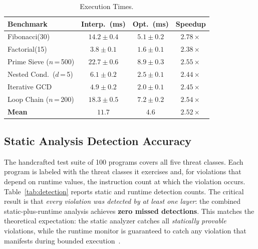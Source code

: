 \documentclass[conference]{IEEEtran}
\begin{document}
\begin{table}[t]
\caption{Execution Times.}
\label{tab:perf}
\centering
\renewcommand{\arraystretch}{1.18}
\small
\begin{tabular}{@{} l c c c @{}}
\toprule
\textbf{Benchmark} & \textbf{Interp.\ (ms)} &
\textbf{Opt.\ (ms)} & \textbf{Speedup} \\
\midrule
Fibonacci(30)              & $14.2 \pm 0.4$ & $5.1 \pm 0.2$ & $2.78\times$ \\
Factorial(15)              & $3.8  \pm 0.1$ & $1.6 \pm 0.1$ & $2.38\times$ \\
Prime Sieve ($n$\,=\,500)  & $22.7 \pm 0.6$ & $8.9 \pm 0.3$ & $2.55\times$ \\
Nested Cond.\ ($d$\,=\,5)  & $6.1  \pm 0.2$ & $2.5 \pm 0.1$ & $2.44\times$ \\
Iterative GCD              & $4.9  \pm 0.2$ & $2.0 \pm 0.1$ & $2.45\times$ \\
Loop Chain ($n$\,=\,200)   & $18.3 \pm 0.5$ & $7.2 \pm 0.2$ & $2.54\times$ \\
\midrule
\textbf{Mean}              & $11.7$         & $4.6$         & $\mathbf{2.52\times}$ \\
\bottomrule
\end{tabular}
\end{table}

\subsection{Static Analysis Detection Accuracy}

The handcrafted test suite of 100 programs covers all five threat
classes. Each program is labeled with the threat classes it exercises
and, for violations that depend on runtime values, the instruction
count at which the violation occurs. Table~\ref{tab:detection}
reports static and runtime detection counts. The critical result is
that \emph{every violation was detected by at least one layer}:
the combined static-plus-runtime analysis achieves
\textbf{zero missed detections}. This matches the theoretical
expectation: the static analyzer catches all \emph{statically
provable} violations, while the runtime monitor is guaranteed to
catch any violation that manifests during bounded
execution~\cite{ami2024false_neg,huang2024static}.
\end{document}
